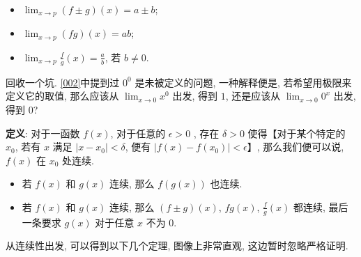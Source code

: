 \begin{tcolorbox}[size=fbox, breakable, enhanced jigsaw, title={极限 (limit)}]
\begin{itemize}
\item
  $\lim_{x\rightarrow p}(f\pm g)(x)=a\pm b$;
\item
  $\lim_{x\rightarrow p}(fg)(x)=ab$;
\item
  $\lim_{x\rightarrow p}\frac{f}{g}(x)=\frac{a}{b}$, 若 $b\neq 0$.
\end{itemize}

\begin{newquote}
回收一个坑. \ref{002}中提到过 $\mathrm{0}^0$ 是未被定义的问题,
一种解释便是, 若希望用极限来定义它的取值, 那么应该从
$\lim_{x\rightarrow0}x^0$ 出发, 得到 $1$, 还是应该从
$\lim_{x\rightarrow0}0^x$ 出发, 得到 $0$?
\end{newquote}

\end{tcolorbox}

\begin{tcolorbox}[size=fbox, breakable, enhanced jigsaw, title={连续性 (continuity)}]

\textbf{定义}: 对于一函数 $f(x)$, 对于任意的 $\epsilon>0$ , 存在
$\delta>0$ 使得【对于某个特定的 $x_0$, 若有 $x$ 满足
$|x-x_0|<\delta$, 便有 $|f(x)-f(x_0)|<\epsilon$】, 那么我们便可以说,
$f(x)$ 在 $x_0$ 处连续.

\begin{itemize}

\item
  若 $f(x)$ 和 $g(x)$ 连续, 那么 $f(g(x))$ 也连续.
\item
  若 $f(x)$ 和 $g(x)$ 连续, 那么 $(f\pm g)(x)$, $fg(x)$,
  $\frac{f}{g}(x)$ 都连续, 最后一条要求 $g(x)$ 对于任意 $x$ 不为
  $0$.
\end{itemize}

从连续性出发, 可以得到以下几个定理, 图像上非常直观, 这边暂时忽略严格证明.

\begin{tcolorbox}[size=fbox, breakable, enhanced jigsaw, title={极值定理 (extreme value theorem)}]


\end{tcolorbox}
\end{tcolorbox}
